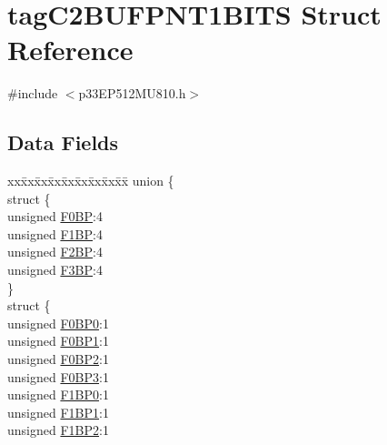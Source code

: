\hypertarget{structtag_c2_b_u_f_p_n_t1_b_i_t_s}{}\section{tag\+C2\+B\+U\+F\+P\+N\+T1\+B\+I\+TS Struct Reference}
\label{structtag_c2_b_u_f_p_n_t1_b_i_t_s}


{\ttfamily \#include $<$p33\+E\+P512\+M\+U810.\+h$>$}

\subsection*{Data Fields}
\begin{DoxyCompactItemize}
\item 
\begin{tabbing}
xx\=xx\=xx\=xx\=xx\=xx\=xx\=xx\=xx\=\kill
union \{\\
\>struct \{\\
\>\>unsigned \hyperlink{structtag_c2_b_u_f_p_n_t1_b_i_t_s_aa9c66c9f4bc4c729ef4f1f87efdeeb88}{F0BP}:4\\
\>\>unsigned \hyperlink{structtag_c2_b_u_f_p_n_t1_b_i_t_s_a13eaa4600b1376f2a013eca6282df97c}{F1BP}:4\\
\>\>unsigned \hyperlink{structtag_c2_b_u_f_p_n_t1_b_i_t_s_a3b2abfa620b4985fea49be15109bf36e}{F2BP}:4\\
\>\>unsigned \hyperlink{structtag_c2_b_u_f_p_n_t1_b_i_t_s_a3c19570796ab9da4c0accd81535e312f}{F3BP}:4\\
\>\} \\
\>struct \{\\
\>\>unsigned \hyperlink{structtag_c2_b_u_f_p_n_t1_b_i_t_s_a637f43f277c54677f408e4dbad68ec7b}{F0BP0}:1\\
\>\>unsigned \hyperlink{structtag_c2_b_u_f_p_n_t1_b_i_t_s_ad970635ce8028c5e09388a003eb8dd49}{F0BP1}:1\\
\>\>unsigned \hyperlink{structtag_c2_b_u_f_p_n_t1_b_i_t_s_a51bf68bc4cf8d68b9ffeffcf232a59a5}{F0BP2}:1\\
\>\>unsigned \hyperlink{structtag_c2_b_u_f_p_n_t1_b_i_t_s_a9e5dc1f1e8846963163f31aba947e9f6}{F0BP3}:1\\
\>\>unsigned \hyperlink{structtag_c2_b_u_f_p_n_t1_b_i_t_s_a114ec7f79a7874cc05755efc870fea6d}{F1BP0}:1\\
\>\>unsigned \hyperlink{structtag_c2_b_u_f_p_n_t1_b_i_t_s_ac434c261b0b9825663072e9f28737a49}{F1BP1}:1\\
\>\>unsigned \hyperlink{structtag_c2_b_u_f_p_n_t1_b_i_t_s_a1790c169dde2a4b27d94be25f133c4bf}{F1BP2}:1\\

\end{tabbing}
\end{DoxyCompactItemize}
